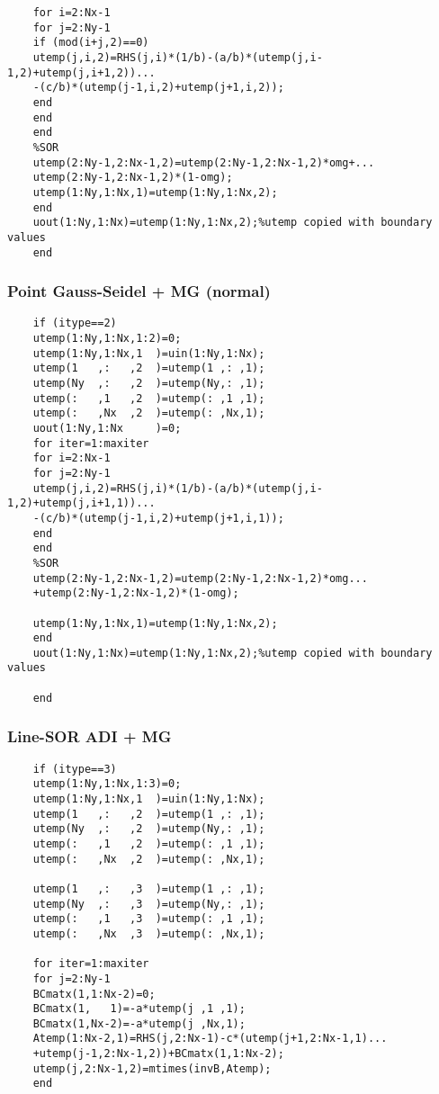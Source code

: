 \documentclass[11pt]{report}
\begin{document}
\begin{appendices}
\begin{enumerate}
\begin{verbatim}
	for i=2:Nx-1
	for j=2:Ny-1
	if (mod(i+j,2)==0)
	utemp(j,i,2)=RHS(j,i)*(1/b)-(a/b)*(utemp(j,i-1,2)+utemp(j,i+1,2))...
	-(c/b)*(utemp(j-1,i,2)+utemp(j+1,i,2));
	end
	end
	end
	%SOR
	utemp(2:Ny-1,2:Nx-1,2)=utemp(2:Ny-1,2:Nx-1,2)*omg+...
	utemp(2:Ny-1,2:Nx-1,2)*(1-omg);
	utemp(1:Ny,1:Nx,1)=utemp(1:Ny,1:Nx,2);
	end
	uout(1:Ny,1:Nx)=utemp(1:Ny,1:Nx,2);%utemp copied with boundary values
	end
	\end{verbatim}
	
	
	\subsubsection*{Point Gauss-Seidel + MG (normal)}
	
	\begin{verbatim}
	if (itype==2)
	utemp(1:Ny,1:Nx,1:2)=0;
	utemp(1:Ny,1:Nx,1  )=uin(1:Ny,1:Nx);
	utemp(1   ,:   ,2  )=utemp(1 ,: ,1);
	utemp(Ny  ,:   ,2  )=utemp(Ny,: ,1);
	utemp(:   ,1   ,2  )=utemp(: ,1 ,1);
	utemp(:   ,Nx  ,2  )=utemp(: ,Nx,1);
	uout(1:Ny,1:Nx     )=0;
	for iter=1:maxiter
	for i=2:Nx-1
	for j=2:Ny-1
	utemp(j,i,2)=RHS(j,i)*(1/b)-(a/b)*(utemp(j,i-1,2)+utemp(j,i+1,1))...
	-(c/b)*(utemp(j-1,i,2)+utemp(j+1,i,1));
	end
	end
	%SOR
	utemp(2:Ny-1,2:Nx-1,2)=utemp(2:Ny-1,2:Nx-1,2)*omg...
	+utemp(2:Ny-1,2:Nx-1,2)*(1-omg);
	
	utemp(1:Ny,1:Nx,1)=utemp(1:Ny,1:Nx,2);
	end
	uout(1:Ny,1:Nx)=utemp(1:Ny,1:Nx,2);%utemp copied with boundary values
	
	end
	\end{verbatim}
	
	
	\subsubsection*{Line-SOR ADI + MG}
	
	\begin{verbatim}
	if (itype==3)
	utemp(1:Ny,1:Nx,1:3)=0;
	utemp(1:Ny,1:Nx,1  )=uin(1:Ny,1:Nx);
	utemp(1   ,:   ,2  )=utemp(1 ,: ,1);
	utemp(Ny  ,:   ,2  )=utemp(Ny,: ,1);
	utemp(:   ,1   ,2  )=utemp(: ,1 ,1);
	utemp(:   ,Nx  ,2  )=utemp(: ,Nx,1);
	
	utemp(1   ,:   ,3  )=utemp(1 ,: ,1);
	utemp(Ny  ,:   ,3  )=utemp(Ny,: ,1);
	utemp(:   ,1   ,3  )=utemp(: ,1 ,1);
	utemp(:   ,Nx  ,3  )=utemp(: ,Nx,1);
	
	for iter=1:maxiter
	for j=2:Ny-1
	BCmatx(1,1:Nx-2)=0;
	BCmatx(1,   1)=-a*utemp(j ,1 ,1);
	BCmatx(1,Nx-2)=-a*utemp(j ,Nx,1);
	Atemp(1:Nx-2,1)=RHS(j,2:Nx-1)-c*(utemp(j+1,2:Nx-1,1)...
	+utemp(j-1,2:Nx-1,2))+BCmatx(1,1:Nx-2);
	utemp(j,2:Nx-1,2)=mtimes(invB,Atemp);
	end
	

\end{verbatim}
\end{enumerate}
\end{appendices}
\end{document}
